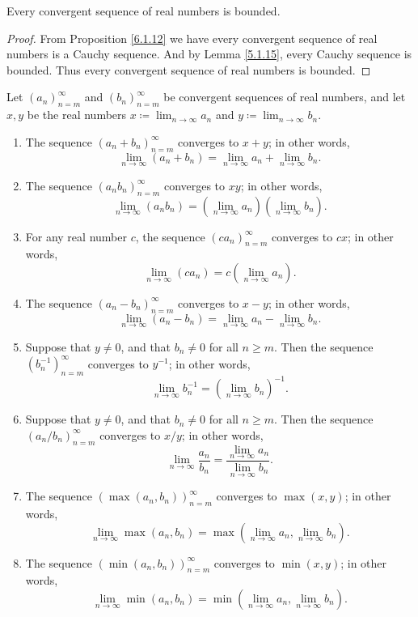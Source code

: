 \begin{corollary}\label{6.1.17}
Every convergent sequence of real numbers is bounded.
\end{corollary}

\begin{proof}
From Proposition \ref{6.1.12} we have every convergent sequence of real numbers is a Cauchy sequence.
And by Lemma \ref{5.1.15}, every Cauchy sequence is bounded.
Thus every convergent sequence of real numbers is bounded.
\end{proof}

\setcounter{theorem}{18}
\begin{theorem}\label{6.1.19}
Let \((a_n)_{n = m}^\infty\) and \((b_n)_{n = m}^\infty\) be convergent sequences of real numbers, and let \(x, y\) be the real numbers \(x \coloneqq \lim_{n \to \infty} a_n\) and \(y \coloneqq \lim_{n \to \infty} b_n\).
\begin{enumerate}
    \item The sequence \((a_n + b_n)_{n = m}^\infty\) converges to \(x + y\);
    in other words,
    \[
        \lim_{n \to \infty} (a_n + b_n) = \lim_{n \to \infty} a_n + \lim_{n \to \infty} b_n.
    \]
    \item The sequence \((a_n b_n)_{n = m}^\infty\) converges to \(xy\);
    in other words,
    \[
        \lim_{n \to \infty} (a_n b_n) = (\lim_{n \to \infty} a_n)(\lim_{n \to \infty} b_n).
    \]
    \item For any real number \(c\), the sequence \((c a_n)_{n = m}^\infty\) converges to \(cx\);
    in other words,
    \[
        \lim_{n \to \infty} (c a_n) = c(\lim_{n \to \infty} a_n).
    \]
    \item The sequence \((a_n - b_n)_{n = m}^\infty\) converges to \(x - y\);
    in other words,
    \[
        \lim_{n \to \infty} (a_n - b_n) = \lim_{n \to \infty} a_n - \lim_{n \to \infty} b_n.
    \]
    \item Suppose that \(y \neq 0\), and that \(b_n \neq 0\) for all \(n \geq m\).
    Then the sequence \((b_n^{-1})_{n = m}^\infty\) converges to \(y^{-1}\);
    in other words,
    \[
        \lim_{n \to \infty} b_n^{-1} = (\lim_{n \to \infty} b_n)^{-1}.
    \]
    \item Suppose that \(y \neq 0\), and that \(b_n \neq 0\) for all \(n \geq m\).
    Then the sequence \((a_n / b_n)_{n = m}^\infty\) converges to \(x / y\);
    in other words,
    \[
        \lim_{n \to \infty} \frac{a_n}{b_n} = \frac{\lim_{n \to \infty} a_n}{\lim_{n \to \infty} b_n}.
    \]
    \item The sequence \((\max(a_n, b_n))_{n = m}^\infty\) converges to \(\max(x, y)\);
    in other words,
    \[
        \lim_{n \to \infty} \max(a_n, b_n) = \max(\lim_{n \to \infty} a_n, \lim_{n \to \infty} b_n).
    \]
    \item The sequence \((\min(a_n, b_n))_{n = m}^\infty\) converges to \(\min(x, y)\);
    in other words,
    \[
        \lim_{n \to \infty} \min(a_n, b_n) = \min(\lim_{n \to \infty} a_n, \lim_{n \to \infty} b_n).
    \]
\end{enumerate}
\end{theorem}

